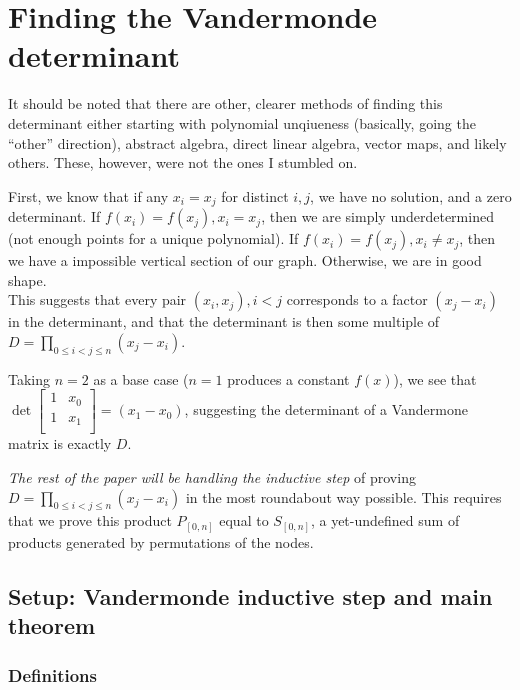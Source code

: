 \documentclass[11pt, oneside]{article} 	%
\begin{document}
\section{Finding the Vandermonde determinant}

It should be noted that there are other, clearer methods of finding this determinant\cite{1} either starting with polynomial unqiueness (basically, going the ``other'' direction), abstract algebra, direct linear algebra, vector maps, and likely others.  These, however, were not the ones I stumbled on.

First, we know that if any $x_i = x_j$ for distinct $i, j$, we have no solution, and a zero determinant. If $f(x_i) = f(x_j), x_i = x_j$, then we are simply underdetermined (not enough points for a unique polynomial).   If $f(x_i) = f(x_j), x_i \neq x_j$, then we have a impossible vertical section of our graph.  Otherwise, we are in good shape.  
\\

This suggests that every pair $(x_i, x_j), i < j$ corresponds to a factor  $(x_j - x_i)$ in the determinant, and that the determinant is then some multiple of $D = \prod_{0 \leq i < j \leq n}(x_j-x_i)$.

Taking $n=2$ as a base case ($n=1$ produces a constant $f(x)$), we see that 
 $\det\begin{bmatrix}
1 & x_0  \\
1 & x_1  \\
\end{bmatrix} = (x_1 - x_0)$, suggesting the determinant of a Vandermone matrix is exactly $D$.  

\emph{The rest of the paper will be handling the inductive step} of proving  $D = \prod_{0 \leq i < j \leq n}(x_j-x_i)$ in the most roundabout way possible.  This requires that we prove this product $P_{[0,n]}$ equal to $S_{[0,n]}$, a yet-undefined sum of products generated by permutations of the nodes.

\subsection{Setup: Vandermonde inductive step and main theorem}
\subsubsection{Definitions} 
\end{document}
